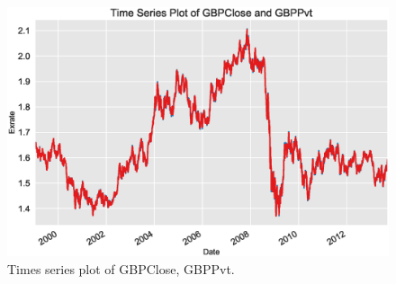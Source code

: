 	\begin{figure}[!ht]
	\centering
	\includegraphics[width=\textwidth]{chapters/chapter_uvts/figures/Sec2-4Fig4.eps}
	\caption{Times series plot of GBPClose, GBPPvt. \label{fig:timegbp}}
	\end{figure}
	
